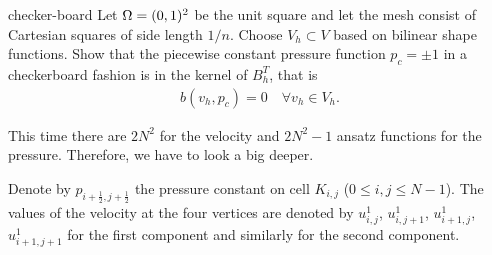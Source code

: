\begin{Problem}{checker-board}
  Let $\Omega = (0,1)^2$ be the unit square and let the mesh consist
  of Cartesian squares of side length $1/n$. Choose $V_h \subset V$
  based on bilinear shape functions. Show that the piecewise constant
  pressure function $p_c=\pm 1$ in a checkerboard fashion is in the
  kernel of $B_h^T$, that is
  \begin{gather*}
    b(v_h, p_c) = 0 \quad\forall v_h\in V_h.
  \end{gather*}
\begin{solution}
This time there are $2N^2$ for the velocity and $2N^2-1$ ansatz functions for
the pressure. Therefore, we have to look a big deeper.

Denote by $p_{i+\frac12, j+\frac12}$ the pressure constant on cell $K_{i,j}$
($0\leq i,j \leq N-1$). The values of the velocity at the four vertices are
denoted by $u^1_{i,j}$, $u^1_{i,j+1}$, $u^1_{i+1,j}$, $u^1_{i+1,j+1}$ for the
first component and similarly for the second component.


\end{solution}
\end{Problem}
